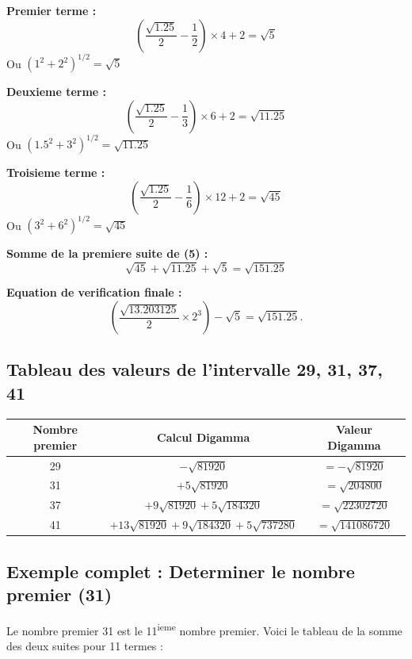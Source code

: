 \documentclass[a4paper,11pt]{article}
\newenvironment{exemple}[1][]{%
    \begin{tcolorbox}[colback=green!5,colframe=holgreen,title={\textbf{Exemple #1}}]
}{%
    \end{tcolorbox}
}
\begin{document}
\begin{exemple}[: Calcul de la premiere suite pour (5)]
\textbf{Premier terme :}
\[
\left(\frac{\sqrt{1.25}}{2} - \frac{1}{2}\right) \times 4 + 2 = \sqrt{5}
\]
Ou $(1^2 + 2^2)^{1/2} = \sqrt{5}$

\textbf{Deuxieme terme :}
\[
\left(\frac{\sqrt{1.25}}{2} - \frac{1}{3}\right) \times 6 + 2 = \sqrt{11.25}
\]
Ou $(1.5^2 + 3^2)^{1/2} = \sqrt{11.25}$

\textbf{Troisieme terme :}
\[
\left(\frac{\sqrt{1.25}}{2} - \frac{1}{6}\right) \times 12 + 2 = \sqrt{45}
\]
Ou $(3^2 + 6^2)^{1/2} = \sqrt{45}$

\textbf{Somme de la premiere suite de (5) :}
\[
\sqrt{45} + \sqrt{11.25} + \sqrt{5} = \sqrt{151.25}
\]

\textbf{Equation de verification finale :}
\[
\left( \frac{\sqrt{13.203125}}{2} \times 2^{3} \right) - \sqrt{5}
= \sqrt{151.25}.
\]
\end{exemple}

\subsection{Tableau des valeurs de l'intervalle 29, 31, 37, 41}

\begin{center}
\begin{tabular}{|c|c|c|}
\hline
\textbf{Nombre premier} & \textbf{Calcul Digamma} & \textbf{Valeur Digamma} \\
\hline
29 & $-\sqrt{81920}$ & $= -\sqrt{81920}$ \\
\hline
31 & $+5\sqrt{81920}$ & $= \sqrt{204800}$ \\
\hline
37 & $+9\sqrt{81920} + 5\sqrt{184320}$ & $= \sqrt{22302720}$ \\
\hline
41 & $+13\sqrt{81920} + 9\sqrt{184320} + 5\sqrt{737280}$ & $= \sqrt{141086720}$ \\
\hline
\end{tabular}
\end{center}

\subsection{Exemple complet : Determiner le nombre premier (31)}

Le nombre premier 31 est le 11\textsuperscript{ieme} nombre premier. Voici le tableau de la somme des deux suites pour 11 termes :
\end{document}
